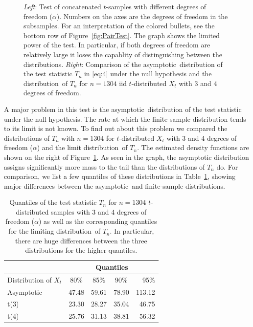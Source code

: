 \documentclass[11pt,a4]{amsart}
\newcommand{\asy}{asymptotic}
\newcommand{\ds}{distribution}
\newcommand{\1}{{\mathbf 1}}
\begin{document}
\begin{figure}[htb!]
\begin{minipage}{0.5\linewidth}
  \end{minipage}
  \caption{
    {\em Left}: Test  of concatenated $t$-samples with different
    degrees of freedom ($\alpha$). Numbers on the axes are the degrees of freedom
    in the subsamples. For an interpretation of the colored bullets,
    see the bottom row of Figure~\ref{fig:PairTest}. The graph shows the limited power
    of the test. In particular, if both degrees of freedom are
    relatively large it loses the capablity of distinguishing between the \ds s.
    {\em Right}: Comparison of the \asy\ distribution of the test statistic
    $T_n$ in \eqref{eq:4} under the null hypothesis and the \ds\ of
    $T_n$ for $n=1304$ iid $t$-distributed $X_t$ with 3 and 4 degrees
    of freedom.
  }
  \label{fig:t_sim_pair}
\end{figure}

\par
A major problem in this test is the \asy\ distribution of the test statistic under the
null hypothesis.  The rate at which the finite-sample distribution tends to its limit is not known.
To find out about this problem we compared the \ds s of $T_n$ 
with $n=1304$ for $t$-distributed $X_t$ with  3 and 4 degrees of freedom ($\alpha$) and
the limit \ds\ of $T_n$.
The estimated density functions are shown on the right of Figure~\ref{fig:t_sim_pair}.
As seen in the graph, the asymptotic distribution assigns
significantly more mass to the tail than the \ds s of $T_n$ do. For
comparison, we list a few quantiles of these \ds s in
Table~\ref{tab:HogaAsymptotic}, showing major differences between the
\asy\ and finite-sample \ds s.
\begin{table}[htb!]
  \centering
  \begin{tabular}{l|c|c|c|r}
    & \multicolumn{4}{c}{Quantiles} \\[2mm]
    \hline
    Distribution of $X_t$& 80\% & 85\% & 90\% & 95\% \\
    \hline
    Asymptotic & 47.48 & 59.61 & 78.90 & 113.12 \\
    t(3)  & 23.30 & 28.27 & 35.04 & 46.75 \\
    t(4)  & 25.76 & 31.13 & 38.81 & 56.32\\[2mm]
  \end{tabular}
  \caption{Quantiles of the test statistic $T_n$ for $n=1304$
    $t$-distributed samples with 3 and 4 degrees of freedom ($\alpha$)
    as well as the corresponding quantiles for the limiting \ds\ of
    $T_n$. In particular, there are huge differences between the three
    \ds s  for the higher quantiles. 
    }
  \label{tab:HogaAsymptotic}
\end{table}
\end{document}

